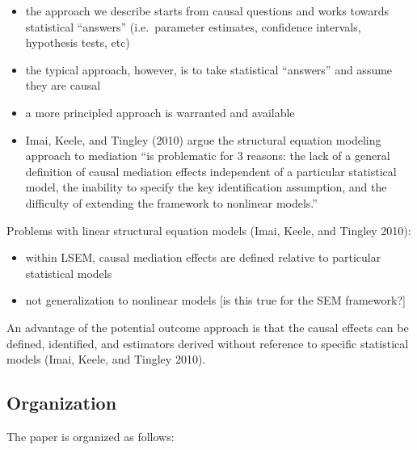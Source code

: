 \documentclass[]{article}
\providecommand{\tightlist}{%
  \setlength{\itemsep}{0pt}\setlength{\parskip}{0pt}}
\begin{document}
\begin{itemize}
\tightlist
\item
  the approach we describe starts from causal questions and works
  towards statistical ``answers'' (i.e.~parameter estimates, confidence
  intervals, hypothesis tests, etc)
\item
  the typical approach, however, is to take statistical ``answers'' and
  assume they are causal
\item
  a more principled approach is warranted and available
\item
  Imai, Keele, and Tingley (2010) argue the structural equation modeling
  approach to mediation ``is problematic for 3 reasons: the lack of a
  general definition of causal mediation effects independent of a
  particular statistical model, the inability to specify the key
  identification assumption, and the difficulty of extending the
  framework to nonlinear models.''
\end{itemize}

Problems with linear structural equation models (Imai, Keele, and
Tingley 2010):

\begin{itemize}
\tightlist
\item
  within LSEM, causal mediation effects are defined relative to
  particular statistical models
\item
  not generalization to nonlinear models {[}is this true for the SEM
  framework?{]}
\end{itemize}

An advantage of the potential outcome approach is that the causal
effects can be defined, identified, and estimators derived without
reference to specific statistical models (Imai, Keele, and Tingley
2010).

\hypertarget{organization}{%
\subsection{Organization}\label{organization}}

The paper is organized as follows:
\end{document}
